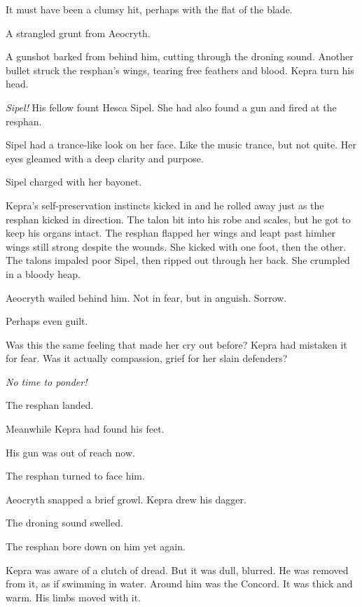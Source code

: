 \documentclass
  [a4paper,
   12pt,
   oneside
  ]%
  {article}
\begin{document}
It must have been a clumsy hit, perhaps with the flat of the blade. 

A strangled grunt from Aeocryth.

A gunshot barked from behind him, cutting through the droning sound. 
Another bullet struck the resphan’s wings, tearing free feathers and blood. 
Kepra turn his head. 

\emph{Sipel!} His fellow fount Hesca Sipel. She had also found a gun and fired at the resphan.

Sipel had a trance-like look on her face.
Like the music trance, but not quite.
Her eyes gleamed with a deep clarity and purpose.

Sipel charged with her bayonet. 

Kepra's self-preservation instincts kicked in and he rolled away just as the resphan kicked in direction. 
The talon bit into his robe and scales, but he got to keep his organs intact.
The resphan flapped her wings and leapt past him\dash{}her wings still strong despite the wounds. 
She kicked with one foot, then the other.
The talons impaled poor Sipel, then ripped out through her back. 
She crumpled in a bloody heap.

Aeocryth wailed behind him. 
Not in fear, but in anguish.
Sorrow. 

Perhaps even guilt.

Was this the same feeling that made her cry out before? Kepra had mistaken it for fear. Was it actually compassion, grief for her slain defenders?

\emph{No time to ponder!}

The resphan landed. 

Meanwhile Kepra had found his feet. 

His gun was out of reach now. 

The resphan turned to face him. 

Aeocryth snapped a brief growl.
Kepra drew his dagger. 

The droning sound swelled.

The resphan bore down on him yet again.

Kepra was aware of a clutch of dread.
But it was dull, blurred. He was removed from it, as if swimming in water. 
Around him was the Concord. 
It was thick and warm. 
His limbs moved with it. 
\end{document}
